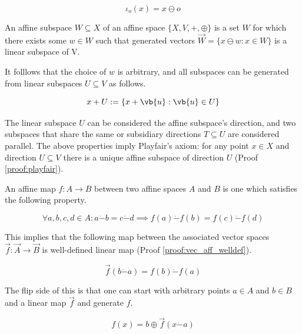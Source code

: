 \begin{equation}
	\iota_{o}(x) = x \ominus o
\end{equation}

\begin{definition}
	An affine subspace $W \subseteq X$ of an affine space $\{ X, V, +, \oplus \}$ is a set $W$ for which there exists some $w \in W$ such that generated vectors $\overrightarrow{W} = \{ x \ominus w: x \in W \}$ is a linear subspace of V.
\end{definition}

It folllows that the choice of $w$ is arbitrary, and all subspaces can be generated from linear subspaces $U \subseteq V$ as follows.

\begin{equation}
	x + U := \{ x + \vb{u}: \vb{u} \in U \}
\end{equation}

The linear subspace $U$ can be considered the affine subspace's direction, and two subspaces that share the same or subsidiary directions $T \subseteq U$ are considered parallel. The above properties imply Playfair's axiom: for any point $x \in X$ and direction $U \subseteq V$ there is a unique affine subspace of direction $U$ (Proof \ref{proof:playfair}).

\begin{definition}
	An affine map $f: A \rightarrow B$ between two affine spaces $A$ and $B$ is one which satisfies the following property.
	
	\begin{equation}
		\forall a, b, c, d \in A: a \dot{-} b = c \dot{-} d \implies f(a) \dot{-} f(b) = f(c) \dot{-} f(d)
	\end{equation}
\end{definition}

This implies that the following map between the associated vector spaces $\overrightarrow{f}: \overrightarrow{A} \rightarrow \overrightarrow{B}$ is well-defined linear map (Proof \ref{proof:vec_aff_welldef}).

\begin{equation}
	\overrightarrow{f}(b \dot{-} a) = f(b) \dot{-} f(a)
\end{equation}

The flip side of this is that one can start with arbitrary points $a \in A$ and $b \in B$ and a linear map $\overrightarrow{f}$ and generate $f$.

\begin{equation}
	f(x) = b \oplus \overrightarrow{f}(x \dot{-} a)
\end{equation}

